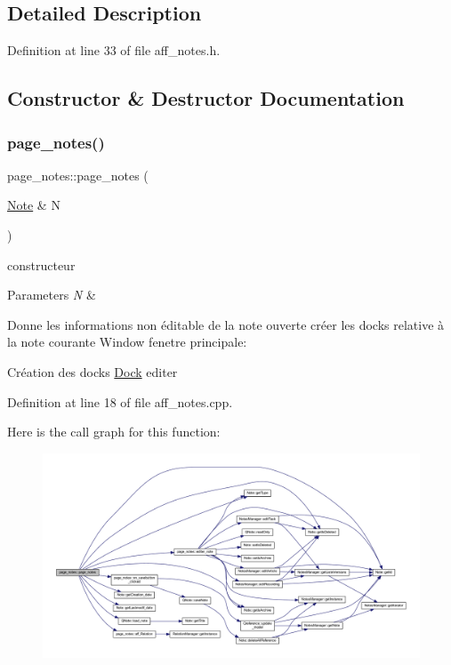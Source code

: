 \subsection{Detailed Description}


Definition at line 33 of file aff\+\_\+notes.\+h.



\subsection{Constructor \& Destructor Documentation}
\mbox{\label{classpage__notes_ad9a1b3dbe6c7901ed37a5784b1094fa6}} 
\subsubsection{\texorpdfstring{page\+\_\+notes()}{page\_notes()}}
{\footnotesize\ttfamily page\+\_\+notes\+::page\+\_\+notes (\begin{DoxyParamCaption}\item[{\hyperlink{class_note}{Note} \&}]{N }\end{DoxyParamCaption})}



constructeur 


\begin{DoxyParams}{Parameters}
{\em N} & \\
\hline
\end{DoxyParams}
Donne les informations non éditable de la note ouverte créer les docks relative à la note courante Window fenetre principale\+:

Création des docks \hyperlink{class_dock}{Dock} editer

Definition at line 18 of file aff\+\_\+notes.\+cpp.

Here is the call graph for this function\+:\nopagebreak
\begin{figure}[H]
\begin{center}
\leavevmode
\includegraphics[width=350pt]{classpage__notes_ad9a1b3dbe6c7901ed37a5784b1094fa6_cgraph}
\end{center}
\end{figure}
\mbox{\label{classpage__notes_a736d7d7d13818c43a20b20127845c6c0}} 
